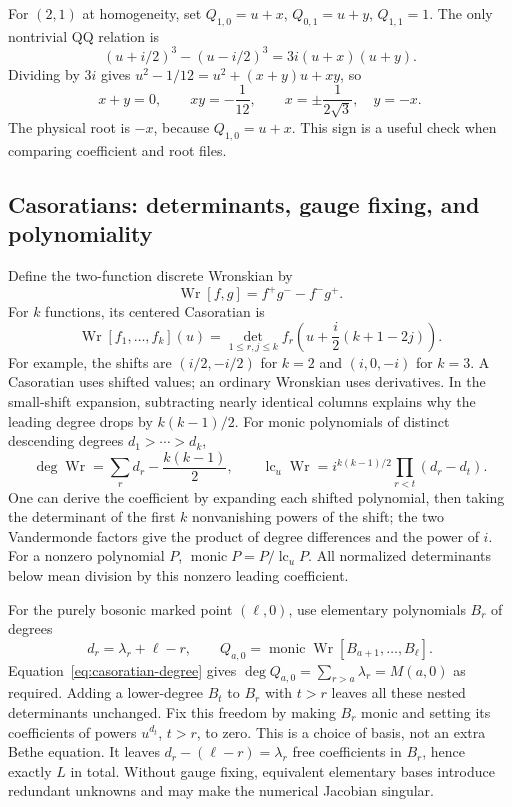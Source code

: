 \documentclass[11pt]{article}
\newcommand{\Wron}{\operatorname{Wr}}
\begin{document}
For $(2,1)$ at homogeneity, set $Q_{1,0}=u+x$, $Q_{0,1}=u+y$,
$Q_{1,1}=1$. The only nontrivial QQ relation is
\[
 (u+i/2)^3-(u-i/2)^3=3i(u+x)(u+y).
\]
Dividing by $3i$ gives
$u^2-1/12=u^2+(x+y)u+xy$, so
\begin{equation}
 \label{eq:small-coefficients}
 x+y=0,\qquad xy=-\frac1{12},\qquad
 x=\pm\frac1{2\sqrt3},\quad y=-x.
\end{equation}
The physical root is $-x$, because $Q_{1,0}=u+x$.
This sign is a useful check when comparing coefficient and root files.

\subsection{Casoratians: determinants, gauge fixing, and polynomiality}

Define the two-function discrete Wronskian by
\begin{equation}
 \label{eq:wron2}
 \Wron[f,g]=f^+g^- -f^-g^+.
\end{equation}
For $k$ functions, its centered Casoratian is
\begin{equation}
 \label{eq:casoratian-k}
 \Wron[f_1,\ldots,f_k](u)
 =\det_{1\le r,j\le k}
 f_r\left(u+\frac{i}{2}(k+1-2j)\right).
\end{equation}
For example, the shifts are $(i/2,-i/2)$ for $k=2$ and $(i,0,-i)$ for
$k=3$. A Casoratian uses shifted values; an ordinary Wronskian uses
derivatives. In the small-shift expansion, subtracting nearly identical
columns explains why the leading degree drops by $k(k-1)/2$.
For monic polynomials of distinct descending degrees $d_1>\cdots>d_k$,
\begin{equation}
 \label{eq:casoratian-degree}
 \deg\Wron=\sum_r d_r-\frac{k(k-1)}2,\qquad
 \operatorname{lc}_u\Wron
 =i^{k(k-1)/2}\prod_{r<t}(d_r-d_t).
\end{equation}
One can derive the coefficient by expanding each shifted polynomial,
then taking the determinant of the first $k$ nonvanishing powers of the
shift; the two Vandermonde factors give the product of degree differences
and the power of $i$. For a nonzero polynomial $P$,
$\operatorname{monic}P=P/\operatorname{lc}_u P$. All normalized
determinants below mean division by this nonzero leading coefficient.

For the purely bosonic marked point $(\ell,0)$, use elementary polynomials
$B_r$ of degrees
\begin{equation}
 \label{eq:bosonic-degrees}
 d_r=\lambda_r+\ell-r,\qquad
 Q_{a,0}=\operatorname{monic}\Wron[B_{a+1},\ldots,B_\ell].
\end{equation}
Equation~\eqref{eq:casoratian-degree} gives
$\deg Q_{a,0}=\sum_{r>a}\lambda_r=M(a,0)$ as required.
Adding a lower-degree $B_t$ to $B_r$ with $t>r$ leaves all these nested
determinants unchanged. Fix this freedom by making $B_r$ monic and
setting its coefficients of powers $u^{d_t}$, $t>r$, to zero. This is a
choice of basis, not an extra Bethe equation. It leaves
$d_r-(\ell-r)=\lambda_r$ free coefficients in $B_r$, hence exactly $L$
in total. Without gauge fixing, equivalent elementary bases introduce
redundant unknowns and may make the numerical Jacobian singular.
\end{document}
